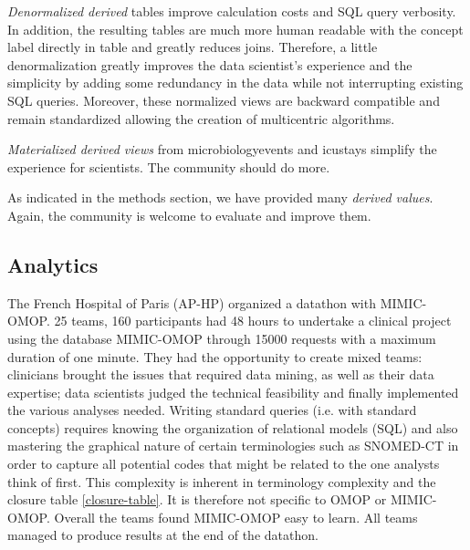 \emph{Denormalized derived} tables improve calculation costs and SQL query verbosity. 
In addition, the resulting tables are much more human readable with the concept 
label directly in table and greatly reduces joins. Therefore, a little 
denormalization greatly improves the data scientist's experience and the simplicity
 by adding some redundancy in the data while not interrupting existing SQL queries. 
Moreover, these normalized views are backward compatible and remain 
standardized allowing the creation of multicentric algorithms.

\emph{Materialized derived views} from microbiologyevents and icustays simplify 
the experience for scientists. The community should do more.
                    
As indicated in the methods section, we have provided many \emph{derived values}. 
Again, the community is welcome to evaluate and improve them.   


\subsection{Analytics}
The French Hospital of Paris (AP-HP) organized a datathon with MIMIC-OMOP. 
25 teams, 160 participants had 48 hours to undertake a clinical project using 
the database MIMIC-OMOP through 15000 requests with a maximum duration of
one minute. They had the opportunity to create mixed teams: clinicians brought 
the issues that required data mining, as well as their data expertise; 
data scientists judged the technical feasibility and finally implemented the 
various analyses needed. Writing standard queries (i.e. with standard concepts) 
requires knowing the organization of relational models (SQL) and also mastering 
the graphical nature of certain terminologies such as SNOMED-CT in order to 
capture all potential codes that might be related to the one analysts think of 
first. This complexity is inherent in terminology complexity and the closure 
table \ref{closure-table}. It is therefore not specific to OMOP or MIMIC-OMOP. 
Overall the teams found MIMIC-OMOP easy to learn.
All teams managed to produce results at the end of the datathon.
